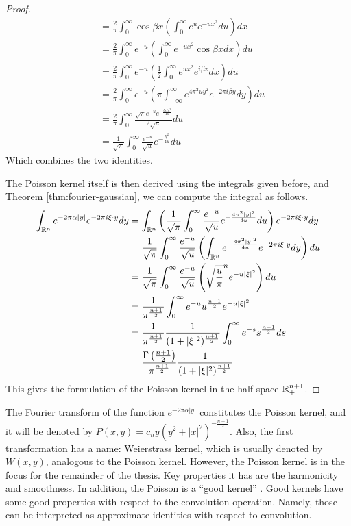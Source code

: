 \begin{proof}
\begin{align*}
        &=\frac{2}{\pi}\int_0^\infty \cos{\beta x}\left(\int_0^\infty e^{u}e^{-ux^2}du\right) dx \\
        &=\frac{2}{\pi}\int_0^\infty e^{-u}\left(\int_0^\infty e^{-ux^2}\cos{\beta x}dx \right)du \\
        &=\frac{2}{\pi}\int_0^\infty e^{-u}\left(\frac{1}{2}\int_0^\infty e^{ux^2}e^{i\beta x}dx \right)du \\
        &=\frac{2}{\pi}\int_0^\infty e^{-u}\left(\pi\int_{-\infty}^\infty e^{4\pi^2uy^2}e^{-2\pi i\beta y}dy\right)du \\
        &=\frac{2}{\pi}\int_0^\infty \frac{\sqrt{\pi}e^{-u}e^{-\frac{beta^2}{4u}}}{2\sqrt{u}}du \\
        &=\frac{1}{\sqrt{\pi}}\int_0^\infty \frac{e^{-u}}{\sqrt{u}}e^{-\frac{\eta^2}{4u}}du
    \end{align*}
    Which combines the two identities.
    
    The Poisson kernel itself is then derived using the integrals given before, and Theorem \ref{thm:fourier-gaussian}, we can compute the integral as follows.
    \begin{align*}
        \int_{\mathbb R^{n}}e^{-2\pi\alpha|y|}e^{-2\pi i \xi\cdot y}dy&=\int_{\mathbb R^n}\left(\frac{1}{\sqrt{\pi}}\int_0^\infty \frac{e^{-u}}{\sqrt{u}}e^{-\frac{4\pi^2|y|^2}{4u}}du\right)e^{-2\pi i \xi\cdot y}dy \\
        &=\frac{1}{\sqrt{\pi}}\int_0^\infty\frac{e^{-u}}{\sqrt{u}}\left(\int_{\mathbb R^n} e^{-\frac{4\pi^2|y|^2}{4u}}e^{-2\pi i \xi\cdot y}dy\right)du \\
        &=\frac{1}{\sqrt{\pi}}\int_0^\infty\frac{e^{-u}}{\sqrt{u}}\left(\sqrt{\frac{u}{\pi}}^ne^{-u|\xi|^2}\right)du \\
        &=\frac{1}{\pi^{\frac{n+1}{2}}}\int_0^\infty e^{-u}u^{\frac{n-1}{2}}e^{-u|\xi|^2} \\
        &=\frac{1}{\pi^{\frac{n+1}{2}}}\frac{1}{(1+|\xi|^2)^{\frac{n+1}{2}}}\int_0^\infty e^{-s}s^{\frac{n-1}{2}}ds \\
        &=\frac{\Gamma\left(\frac{n+1}{2}\right)}{\pi^{\frac{n+1}{2}}}\frac{1}{(1+|\xi|^2)^{\frac{n+1}{2}}}
    \end{align*}
    This gives the formulation of the Poisson kernel in the half-space $\mathbb R_+^{n+1}$.
\end{proof}

The Fourier transform of the function $e^{-2\pi\alpha|y|}$ constitutes the Poisson kernel, and it will be denoted by $P(x,y)=c_ny(y^2+|x|^2)^{-\frac{n+1}{2}}$. Also, the first transformation has a name: Weierstrass kernel, which is usually denoted by $W(x,y)$, analogous to the Poisson kernel. However, the Poisson kernel is in the focus for the remainder of the thesis. Key properties it has are the harmonicity and smoothness. In addition, the Poisson is a ``good kernel'' \cite{SteinShack1}. Good kernels have some good properties with respect to the convolution operation. Namely, those can be interpreted as approximate identities with respect to convolution.

